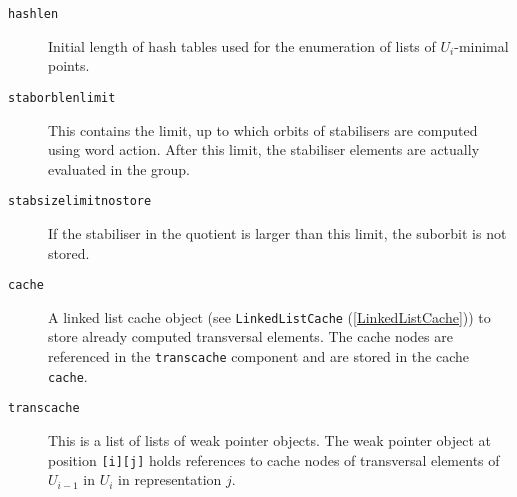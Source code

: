 \documentclass[a4paper,11pt]{report}
\begin{document}
{{{\begin{description}
\item[{\texttt{hashlen}}]  Initial length of hash tables used for the enumeration of lists of $U_i$-minimal points. 
\item[{\texttt{staborblenlimit}}]  This contains the limit, up to which orbits of stabilisers are computed using
word action. After this limit, the stabiliser elements are actually evaluated
in the group. 
\item[{\texttt{stabsizelimitnostore}}]  If the stabiliser in the quotient is larger than this limit, the suborbit is
not stored. 
\item[{\texttt{cache}}] A linked list cache object (see \texttt{LinkedListCache} (\ref{LinkedListCache})) to store already computed transversal elements. The cache nodes are
referenced in the \texttt{transcache} component and are stored in the cache \texttt{cache}. 
\item[{\texttt{transcache}}] This is a list of lists of weak pointer objects. The weak pointer object at
position \texttt{[i][j]} holds references to cache nodes of transversal elements of $U_{i-1}$ in $U_i$ in representation $j$. 
\end{description}
 }

 
}}
\end{document}
